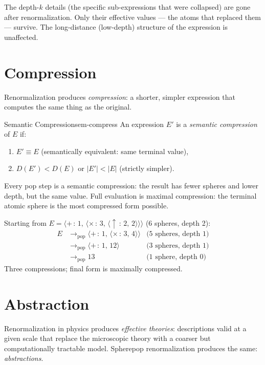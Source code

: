 The depth-$k$ details (the specific sub-expressions that were collapsed)
are gone after renormalization. Only their effective values — the atoms
that replaced them — survive. The long-distance (low-depth) structure
of the expression is unaffected.

\section{Compression}

Renormalization produces \emph{compression}: a shorter, simpler
expression that computes the same thing as the original.

\begin{definition}{Semantic Compression}{sem-compress}
  An expression $E'$ is a \emph{semantic compression} of $E$ if:
  \begin{enumerate}
    \item $E' \equiv E$ (semantically equivalent: same terminal value),
    \item $D(E') < D(E)$ or $|E'| < |E|$ (strictly simpler).
  \end{enumerate}
\end{definition}

Every pop step is a semantic compression: the result has fewer spheres
and lower depth, but the same value. Full evaluation is maximal
compression: the terminal atomic sphere is the most compressed form
possible.

\begin{example}
  Starting from $E = \langle{+}\,:\, 1,\, \langle{\times}\,:\,3,\,
  \langle{\uparrow}\,:\,2,\,2\rangle\rangle\rangle$ (6 spheres, depth 2):
  \begin{align*}
    E &\to_\text{pop} \langle{+}\,:\, 1,\, \langle{\times}\,:\,3,\,4\rangle\rangle
      & \text{(5 spheres, depth 1)}\\
    &\to_\text{pop} \langle{+}\,:\, 1,\, 12\rangle
      & \text{(3 spheres, depth 1)}\\
    &\to_\text{pop} 13
      & \text{(1 sphere, depth 0)}
  \end{align*}
  Three compressions; final form is maximally compressed.
\end{example}

\section{Abstraction}

Renormalization in physics produces \emph{effective theories}: descriptions
valid at a given scale that replace the microscopic theory with a coarser
but computationally tractable model. Spherepop renormalization produces
the same: \emph{abstractions}.

